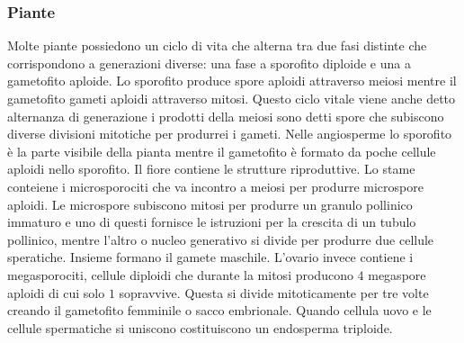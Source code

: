 \subsubsection{Piante}
Molte piante possiedono un ciclo di vita che alterna tra due fasi distinte che corrispondono a generazioni diverse: una fase a sporofito diploide e una a gametofito aploide. Lo sporofito produce spore
aploidi attraverso meiosi mentre il gametofito gameti aploidi attraverso mitosi. Questo ciclo vitale viene anche detto alternanza di generazione i prodotti della meiosi sono detti 
spore che subiscono diverse divisioni mitotiche per produrrei i gameti. Nelle angiosperme lo sporofito \`e la parte visibile della pianta mentre il gametofito \`e formato da poche cellule aploidi nello
sporofito. Il fiore contiene le strutture riproduttive. Lo stame conteiene i microsporociti che va incontro a meiosi per produrre microspore aploidi. Le microspore subiscono mitosi per produrre un 
granulo pollinico immaturo e uno di questi fornisce le istruzioni per la crescita di un tubulo pollinico, mentre l'altro o nucleo generativo si divide per produrre due cellule speratiche. 
Insieme formano il gamete maschile. L'ovario invece contiene i megasporociti, cellule diploidi che durante la mitosi producono $4$ megaspore aploidi di cui solo $1$ sopravvive. Questa si divide 
mitoticamente per tre volte creando il gametofito femminile o sacco embrionale. Quando cellula uovo e le cellule spermatiche si uniscono costituiscono un endosperma triploide.
